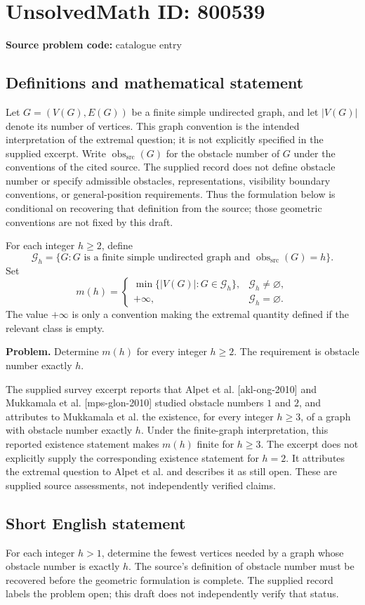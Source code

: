 \documentclass[11pt]{article}
\begin{document}
\section*{UnsolvedMath ID: 800539}
\textbf{Source problem code:} catalogue entry
\subsection{Definitions and mathematical statement}
Let \(G=(V(G),E(G))\) be a finite simple undirected graph, and let \(|V(G)|\) denote its number of vertices. This graph convention is the intended interpretation of the extremal question; it is not explicitly specified in the supplied excerpt. Write \(\operatorname{obs}_{\mathrm{src}}(G)\) for the obstacle number of \(G\) under the conventions of the cited source. The supplied record does not define obstacle number or specify admissible obstacles, representations, visibility boundary conventions, or general-position requirements. Thus the formulation below is conditional on recovering that definition from the source; those geometric conventions are not fixed by this draft.

For each integer \(h\geq 2\), define
\[
\mathcal{G}_h=\{G: G\text{ is a finite simple undirected graph and }\operatorname{obs}_{\mathrm{src}}(G)=h\}.
\]
Set
\[
m(h)=
\begin{cases}
\min\{|V(G)|:G\in\mathcal{G}_h\},&\mathcal{G}_h\neq\varnothing,\\
+\infty,&\mathcal{G}_h=\varnothing.
\end{cases}
\]
The value \(+\infty\) is only a convention making the extremal quantity defined if the relevant class is empty.

\textbf{Problem.} Determine \(m(h)\) for every integer \(h\geq 2\). The requirement is obstacle number exactly \(h\).

The supplied survey excerpt reports that Alpet et al. [akl-ong-2010] and Mukkamala et al. [mps-glon-2010] studied obstacle numbers \(1\) and \(2\), and attributes to Mukkamala et al. the existence, for every integer \(h\geq 3\), of a graph with obstacle number exactly \(h\). Under the finite-graph interpretation, this reported existence statement makes \(m(h)\) finite for \(h\geq 3\). The excerpt does not explicitly supply the corresponding existence statement for \(h=2\). It attributes the extremal question to Alpet et al. and describes it as still open. These are supplied source assessments, not independently verified claims.
\subsection{Short English statement}
For each integer \(h>1\), determine the fewest vertices needed by a graph whose obstacle number is exactly \(h\). The source's definition of obstacle number must be recovered before the geometric formulation is complete. The supplied record labels the problem open; this draft does not independently verify that status.
\end{document}
